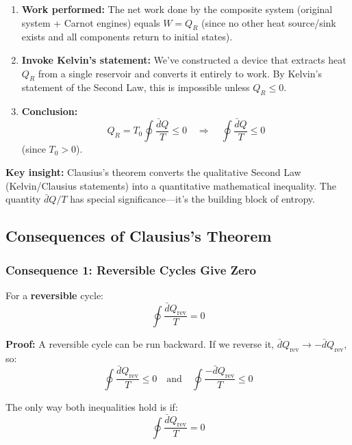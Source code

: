 \documentclass[9pt,twocoloumn]{article}
\begin{document}
\begin{enumerate}
    \item \textbf{Work performed:} The net work done by the composite system (original system + Carnot engines) equals $W = Q_R$ (since no other heat source/sink exists and all components return to initial states).

    \item \textbf{Invoke Kelvin's statement:} We've constructed a device that extracts heat $Q_R$ from a single reservoir and converts it entirely to work. By Kelvin's statement of the Second Law, this is impossible unless $Q_R \leq 0$.

    \item \textbf{Conclusion:}
    \begin{equation}
    Q_R = T_0 \oint \frac{\bar{d}Q}{T} \leq 0 \quad \Rightarrow \quad \boxed{\oint \frac{\bar{d}Q}{T} \leq 0}
    \end{equation}
    (since $T_0 > 0$).
\end{enumerate}

\textbf{Key insight:} Clausius's theorem converts the qualitative Second Law (Kelvin/Clausius statements) into a quantitative mathematical inequality. The quantity $\bar{d}Q/T$ has special significance—it's the building block of entropy.

\subsection{Consequences of Clausius's Theorem}

\subsubsection{Consequence 1: Reversible Cycles Give Zero}

For a \textbf{reversible} cycle:
\begin{equation}
\oint \frac{\bar{d}Q_{\text{rev}}}{T} = 0
\end{equation}

\textbf{Proof:} A reversible cycle can be run backward. If we reverse it, $\bar{d}Q_{\text{rev}} \to -\bar{d}Q_{\text{rev}}$, so:
\begin{equation}
\oint \frac{\bar{d}Q_{\text{rev}}}{T} \leq 0 \quad \text{and} \quad \oint \frac{-\bar{d}Q_{\text{rev}}}{T} \leq 0
\end{equation}

The only way both inequalities hold is if:
\begin{equation}
\oint \frac{\bar{d}Q_{\text{rev}}}{T} = 0
\end{equation}
\end{document}
